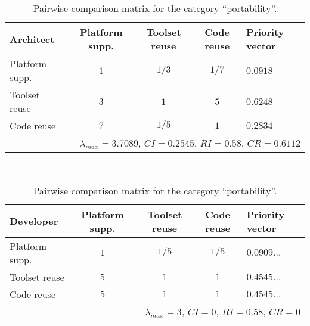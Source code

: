 \begin{table}[h]
    \begin{center}
        \begin{tabular}{lcccl}
            \hline
            \textbf{Architect}     & Platform supp. & Toolset reuse & Code reuse & Priority vector \\ 
            \hline
            Platform supp.         & $1$            & $1/3$         & $1/7$      & $0.0918$        \\
            Toolset reuse          & $3$            & $1$           & $5$        & $0.6248$        \\
            Code reuse             & $7$            & $1/5$         & $1$        & $0.2834$        \\
            \hline
            \multicolumn{5}{r}{$\lambda_{max} = 3.7089$, $CI = 0.2545$, $RI = 0.58$, $CR = 0.6112$}\\
            \hline
        \end{tabular}
        \\\vspace{1em}
        \begin{tabular}{lcccl}
            \hline
            \textbf{Developer}     & Platform supp. & Toolset reuse & Code reuse & Priority vector \\ 
            \hline
            Platform supp.         & $1$            & $1/5$         & $1/5$      & $0.0909\ldots$  \\
            Toolset reuse          & $5$            & $1$           & $1$        & $0.4545\ldots$  \\
            Code reuse             & $5$            & $1$           & $1$        & $0.4545\ldots$  \\
            \hline
            \multicolumn{5}{r}{$\lambda_{max} = 3$, $CI = 0$, $RI = 0.58$, $CR = 0$}               \\
            \hline
        \end{tabular}
        \caption{Pairwise comparison matrix for the category ``portability''.}
        \label{tab:portability}
    \end{center}
\end{table}

